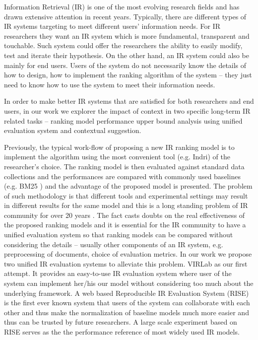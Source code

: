 %
%
Information Retrieval (IR) is one of the most evolving research fields 
and has drawn extensive attention in recent years. 
Typically, there are different types of IR systems targeting to meet 
different users' information needs. 
For IR researchers they want an IR system which is more 
fundamental, transparent and touchable. Such system could offer the researchers 
the ability to easily modify, test and iterate their hypothesis. 
On the other hand, an IR system could also be mainly for end users. 
Users of the system do not necessarily know the details of how to design, 
how to implement the ranking algorithm of the system -- they just need to know 
how to use the system to meet their information needs.

In order to make better IR systems that are satisfied for both researchers 
and end users, in our work we explorer the impact of context in two specific 
long-term IR related tasks -- ranking model performance upper bound analysis 
using unified evaluation system and contextual suggestion.
 
Previously, the typical work-flow of proposing a new IR ranking model is to 
implement the algorithm using the most convenient tool (e.g. Indri) of the 
researcher's choice. 
The ranking model is then evaluated against standard data collections and 
the performances are compared with commonly used baselines (e.g. BM25 \cite{Robertson96okapiat3}) 
and the advantage of the proposed model is presented. 
The problem of such methodology is that different tools and experimental 
settings may result in different results for the same model \cite{Yang:2016:RSI:2970398.2970415} 
and this is a long standing problem of IR community for over 20 years \cite{Armstrong:2009:IDA:1645953.1646031}. The fact casts doubts on the real 
effectiveness of the proposed ranking models and it is essential for the 
IR community to have a unified evaluation system so that ranking models 
can be compared without considering the details -- usually other components 
of an IR system, e.g. preprocessing of documents, choice of evaluation metrics. 
In our work we propose two unified IR evaluation systems to alleviate this problem. 
VIRLab as our first attempt. It provides an easy-to-use IR evaluation system 
where user of the system can implement her/his our model without considering 
too much about the underlying framework.
A web based Reproducible IR Evaluation System (RISE) is the first ever known 
system that users of the system can collaborate with each other and thus make 
the normalization of baseline models much more easier and thus can be trusted 
by future researchers. A large scale experiment based on RISE serves as the 
the performance reference of most widely used IR models.

